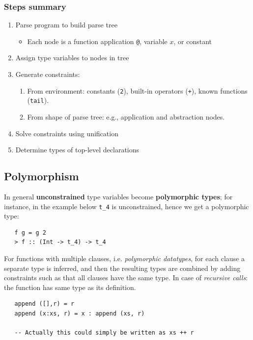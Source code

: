 \subsubsection{Steps summary}
\begin{enumerate}
   \item Parse program to build parse tree
   \begin{itemize}
      \item Each node is a function application \lstinline|@|, variable $x$, or constant
   \end{itemize}
   \item Assign type variables to nodes in tree
   \item Generate constraints:
   \begin{enumerate}
      \item From environment: constants (\lstinline|2|), built-in
      operators (\lstinline|+|), known functions (\lstinline|tail|).
      \item From shape of parse tree: e.g., application and
      abstraction nodes.
   \end{enumerate}
   \item Solve constraints using unification
   \item Determine types of top-level declarations
\end{enumerate}

\subsection{Polymorphism}

In general \textbf{unconstrained} type variables become \textbf{polymorphic types};
for instance, in the example below \lstinline|t_4| is unconstrained, hence we get a polymorphic type:
\begin{lstlisting}
   f g = g 2
   > f :: (Int -> t_4) -> t_4
\end{lstlisting}
\nl

For functions with multiple clauses, i.e. \textit{polymorphic datatypes},
for each clause a separate type is inferred, 
and then the resulting types are combined by adding constraints such as that all clauses have the same type.
In case of \textit{recursive calls}:
the function has same type as its definition.

\begin{lstlisting}
   append ([],r) = r
   append (x:xs, r) = x : append (xs, r)

   -- Actually this could simply be written as xs ++ r
\end{lstlisting}

